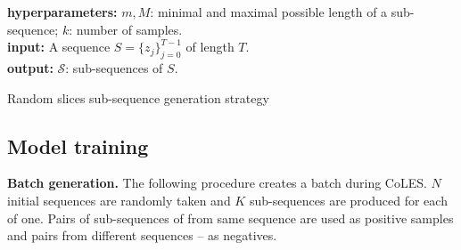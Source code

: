 \documentclass[sigconf, anonymous]{acmart}
\begin{document}
\begin{algorithm}
    \SetAlgoLined
    \textbf{hyperparameters:}
        $m, M$: minimal and maximal possible length of a sub-sequence;
        $k$: number of samples.
    \\ %
    \textbf{input:}
        A sequence $S = \{z_j\}_{j=0}^{T-1}$ of length $T$.
    \\
    \textbf{output:}
        $\mathcal{S}$: sub-sequences of $S$.
    \\
    \BlankLine
    \For{$i\leftarrow 1$ \KwTo $k$}{
        Generate a random integer $T_i$ uniformly from $[1, T]$;
        \\
        \uIf{$T_i\in [m, M]$}{  %
            Generate a random integer $s$ from $[0, T - T_i)$;
            \\
            Add the slice $
                \tilde{S}_i := \bigl\{z_{s + j}\bigr\}_{j=0}^{T_i - 1}  %
            $ to $\mathcal{S}$;
            \\
        }
    }
    \caption{Random slices sub-sequence generation strategy}
    \label{alg-slce-ss}
\end{algorithm}


\subsection{Model training} \label{sec-training}

\textbf{Batch generation.} The following procedure creates a batch during CoLES. $N$ initial
sequences are randomly taken and $K$ sub-sequences are produced for each of one. Pairs of
sub-sequences of from same sequence are used as positive samples and pairs from different
sequences -- as negatives.

\end{document}
